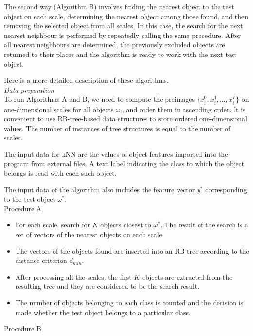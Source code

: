\documentclass[sensors,article,submit,moreauthors,pdftex]{Definitions/mdpi}
\begin{document}
\begin{paracol}{2}
The second way (Algorithm B) involves finding the nearest object to the test object on each scale, determining the nearest object among those found, and then removing the selected object from all scales. In this case, the search for the next nearest neighbour is performed by repeatedly calling the same procedure. After all nearest neighbours are determined, the previously excluded objects are returned to their places and the algorithm is ready to work with the next test object.

Here is a more detailed description of these algorithms.
\\[12pt]
\textit{Data preparation}
\\[12pt]
To run Algorithms A and B, we need to compute the preimages $\{x_i^0, x_i^1, ..., x_i^L\}$ on one-dimensional scales for all objects $\omega_i$, and order them in ascending order. It is convenient to use RB-tree-based data structures to store ordered one-dimensional values. The number of instances of tree structures is equal to the number of scales.

The input data for kNN are the values of object features imported into the program from external files. A text label indicating the class to which the object belongs is read with each such object.

The input data of the algorithm also includes the feature vector $y^*$ corresponding to the test object $\omega^*$.\\

\underline{Procedure A}

\begin{itemize}
\item For each scale, search for $K$ objects closest to $\omega^*$. The result of the search is a set of vectors of  the nearest objects on each scale.
\item The vectors of the objects found are inserted into an RB-tree according to the distance criterion $d_{min}$.
\item After processing all the scales, the first $K$ objects are extracted from the resulting tree and they are considered to be the search result.
\item The number of objects belonging to each class is counted and the decision is made whether   the test object belongs to a particular class.
\end{itemize}

\underline{Procedure B}


\end{paracol}
\end{document}
